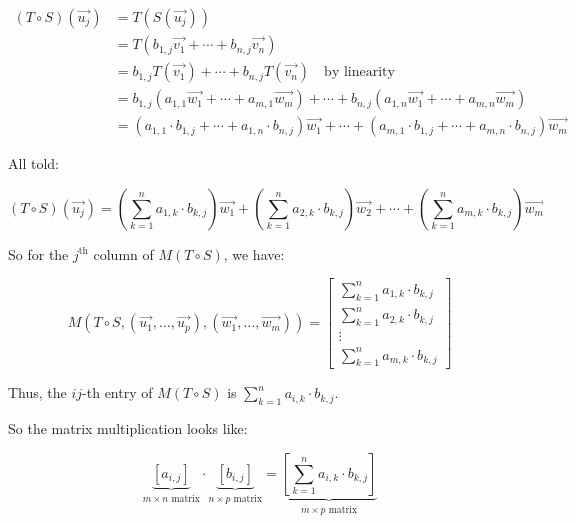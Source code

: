 {	\begin{align*}
		(T \circ S)(\vec{u_j} ) & = T(S(\vec{u_j} ))                                                                                                                                 \\
		                        & = T(b_{1,j} \vec{v_1} + \cdots + b_{n,j} \vec{v_n})                                                                                                \\
		                        & = b_{1,j} T(\vec{v_1} ) + \cdots + b_{n,j} T(\vec{v_n} ) \quad\text{by linearity}                                                                  \\
		                        & = b_{1,j} (a_{1,1} \vec{w_1} + \cdots + a_{m,1} \vec{w_m}) + \cdots + b_{n,j} (a_{1,n} \vec{w_1} + \cdots + a_{m,n} \vec{w_m})                     \\
		                        & = (a_{1,1} \cdot b_{1,j} + \cdots + a_{1,n} \cdot b_{n,j}) \vec{w_1} + \cdots + (a_{m,1} \cdot b_{1,j} + \cdots + a_{m,n} \cdot b_{n,j}) \vec{w_m}
	\end{align*}

	All told:

	\[
		(T \circ S)(\vec{u_{j}} ) = \left( \sum_{k=1}^{n} a_{1,k} \cdot b_{k,j} \right) \vec{w_1} + \left( \sum_{k=1}^{n} a_{2,k} \cdot b_{k,j} \right) \vec{w_2} + \cdots + \left( \sum_{k=1}^{n} a_{m,k} \cdot b_{k,j} \right) \vec{w_m}
	\]

	So for the \(j^{\text{th}}\) column of \(M(T \circ S)\), we have:

	\[
		M(T \circ S, (\vec{u_1}, \ldots, \vec{u_p} ), (\vec{w_1}, \ldots, \vec{w_m} )) = \begin{bmatrix} \sum_{k=1}^{n} a_{1,k} \cdot b_{k, j}\\ \sum_{k=1}^{n} a_{2,k} \cdot b_{k, j}\\ \vdots \\ \sum_{k=1}^{n} a_{m,k} \cdot b_{k, j} \end{bmatrix}
	\]

	Thus, the \(ij\)-th entry of \(M(T \circ S)\) is \(\sum_{k=1}^{n} a_{i,k} \cdot b_{k,j}\).

	So the matrix multiplication looks like:

	\[
		\underbrace{\left[ a_{i,j}\right]}_{m\times n \text{ matrix}} \cdot \underbrace{\left[ b_{i,j}\right]}_{n\times p \text{ matrix}} = \underbrace{\left[ \sum_{k=1}^{n} a_{i,k} \cdot b_{k,j}\right]}_{m\times p \text{ matrix}}
	\]
}

